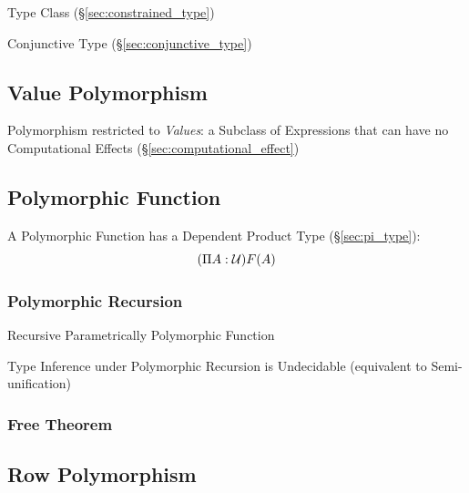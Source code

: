 Type Class (\S\ref{sec:constrained_type})

Conjunctive Type (\S\ref{sec:conjunctive_type})



\subsection{Value Polymorphism}\label{sec:value_polymorphism}

Polymorphism restricted to \emph{Values}: a Subclass of Expressions
that can have no Computational Effects
(\S\ref{sec:computational_effect})



\subsection{Polymorphic Function}\label{sec:polymorphic_function}

A Polymorphic Function has a Dependent Product Type
(\S\ref{sec:pi_type}):
\[
  (\Pi A:\mathcal{U}) F(A)
\]



\subsubsection{Polymorphic Recursion}\label{sec:polymorphic_recursion}

Recursive Parametrically Polymorphic Function

Type Inference under Polymorphic Recursion is Undecidable (equivalent
to Semi-unification) %



\subsubsection{Free Theorem}\label{sec:free_theorem}



\subsection{Row Polymorphism}\label{sec:row_polymorphism}

